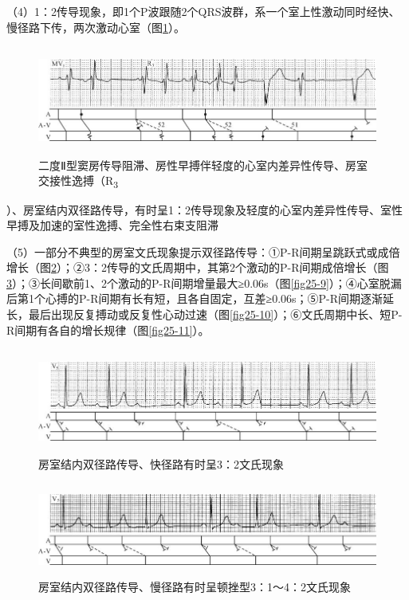 （4）1：2传导现象，即1个P波跟随2个QRS波群，系一个室上性激动同时经快、慢径路下传，两次激动心室（图\ref{fig25-6}）。

\begin{figure}[!htbp]
 \centering
 \includegraphics[width=5.80208in,height=1.40625in]{./images/Image00417.jpg}
 \captionsetup{justification=centering}
 \caption{二度Ⅱ型窦房传导阻滞、房性早搏伴轻度的心室内差异性传导、房室交接性逸搏（R\textsubscript{3}}
 \label{fig25-6}
  \end{figure} 
）、房室结内双径路传导，有时呈1：2传导现象及轻度的心室内差异性传导、室性早搏及加速的室性逸搏、完全性右束支阻滞

（5）一部分不典型的房室文氏现象提示双径路传导：①P-R间期呈跳跃式或成倍增长（图\ref{fig25-7}）；②3：2传导的文氏周期中，其第2个激动的P-R间期成倍增长（图\ref{fig25-8}）；③长间歇前1、2个激动的P-R间期增量最大≥0.06s（图\ref{fig25-9}）；④心室脱漏后第1个心搏的P-R间期有长有短，且各自固定，互差≥0.06s；⑤P-R间期逐渐延长，最后出现反复搏动或反复性心动过速（图\ref{fig25-10}）；⑥文氏周期中长、短P-R间期有各自的增长规律（图\ref{fig25-11}）。

\begin{figure}[!htbp]
 \centering
 \includegraphics[width=5.80208in,height=1.35417in]{./images/Image00418.jpg}
 \captionsetup{justification=centering}
 \caption{房室结内双径路传导、快径路有时呈3：2文氏现象}
 \label{fig25-7}
  \end{figure} 

\begin{figure}[!htbp]
 \centering
 \includegraphics[width=5.80208in,height=1.20833in]{./images/Image00419.jpg}
 \captionsetup{justification=centering}
 \caption{房室结内双径路传导、慢径路有时呈顿挫型3：1～4：2文氏现象}
 \label{fig25-8}
  \end{figure} 

